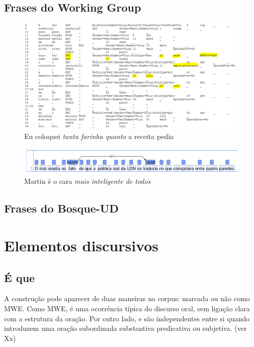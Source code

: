 \documentclass[output=paper,colorlinks,citecolor=brown]{langscibook}
\begin{document}
	\subsection{Frases do Working Group}
	
	\begin{figure}
	    \centering
	    \includegraphics[width=\textwidth,height=\textheight,keepaspectratio]{imagesDrive/image20.png}
	    \caption{Eu coloquei \emph{tanta farinha quanto} a receita pedia}
	    \label{fig:comparative1}
	    \end{figure}{}
	
	\begin{figure}
	    \centering
	    \includegraphics[width=\textwidth,height=\textheight,keepaspectratio]{imagesDrive/image27.png}
	    \caption{Martin é o cara \emph{mais inteligente de todos}}
	    \label{fig:comparative2}
	\end{figure}{}
	
	\subsection{Frases do Bosque-UD}

\section{Elementos discursivos}


	\subsection{É que}


	A construção  pode aparecer de duas maneiras no corpus: marcada ou não como MWE. Como MWE,  é uma ocorrência típica do discurso oral, sem ligação clara com a estrutura da oração. Por outro lado,  e  são independentes entre si quando introduzem uma oração subordinada substantiva predicativa ou subjetiva. (ver Xx)
\end{document}

